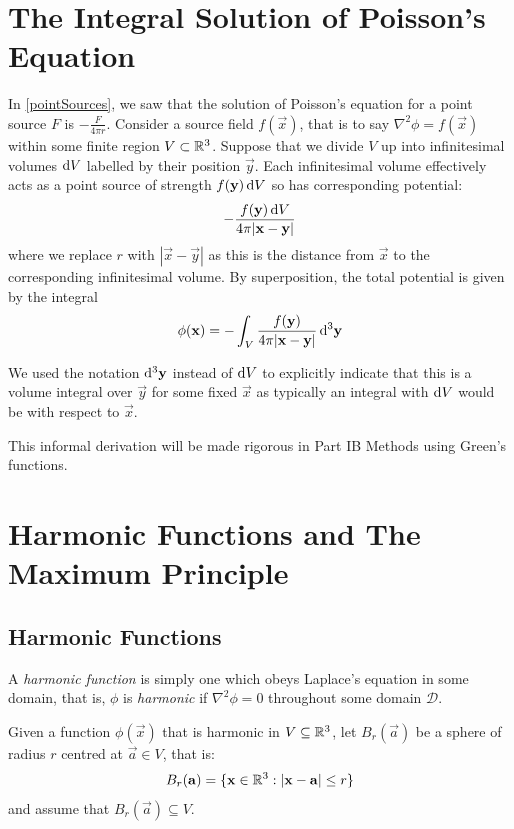 \documentclass[../main.tex]{subfiles}
\begin{document}
\section{The Integral Solution of Poisson's Equation}
In \cref{pointSources}, we saw that the solution of Poisson's equation for a point source $F$ is $-\frac{F}{4\pi r}$.
Consider a source field $f(\vec{x})$, that is to say $\nabla^2 \phi = f(\vec{x})$ within some finite region $V \subset \mathbb{R}^3$.
Suppose that we divide $V$ up into infinitesimal volumes $\d{V}$ labelled by their position $\vec{y}$.
Each infinitesimal volume effectively acts as a point source of strength $f(\vec{y})\d{V}$ so has corresponding potential:
\[
  -\frac{f(\vec{y}) \d{V}}{4\pi|\vec{x} - \vec{y}|}
\]
where we replace $r$ with $|\vec{x} - \vec{y}|$ as this is the distance from $\vec{x}$ to the corresponding infinitesimal volume.
By superposition, the total potential is given by the integral
\[
  \phi(\vec{x}) = -\int_{V} \frac{f(\vec{y})}{4\pi|\vec{x} - \vec{y}|} \d^3{\vec{y}}
\]
\begin{remark}[Notation]
  We used the notation $\d^3{\vec{y}}$ instead of $\d{V}$ to explicitly indicate that this is a volume integral over $\vec{y}$ for some fixed $\vec{x}$ as typically an integral with $\d{V}$ would be with respect to $\vec{x}$.
\end{remark}
\begin{remark}
  This informal derivation will be made rigorous in Part IB Methods using Green's functions.
\end{remark}
\section{Harmonic Functions and The Maximum Principle}
\subsection{Harmonic Functions}
\begin{definition}
  A \textit{harmonic function} is simply one which obeys Laplace's equation in some domain, that is, $\phi$ is \textit{harmonic} if $\nabla^2 \phi = 0$ throughout some domain $\mathscr{D}$.
\end{definition}
Given a function $\phi(\vec{x})$ that is harmonic in $V \subseteq \mathbb{R}^3$, let $B_r(\vec{a})$ be a sphere of radius $r$ centred at $\vec{a} \in V$, that is:
\[
  B_r(\mathbf{\bm{a}}) = \{\mathbf{\bm{x}} \in \mathbb{R}^3: |\mathbf{\bm{x}} - \mathbf{\bm{a}}| \leq r\}
\]
and assume that $B_r(\vec{a}) \subseteq V$.
\end{document}
